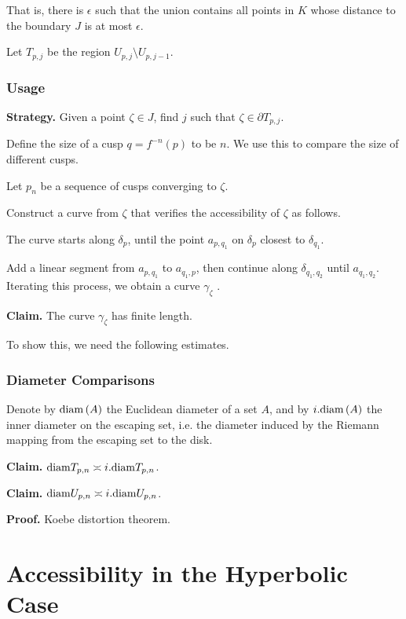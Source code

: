 \documentclass[hebrew,english]{article}
\begin{document}
That is, there is $\epsilon$ such that the union contains all points
in $K$ whose distance to the boundary $J$ is at most $\epsilon$.

Let $T_{p,j}$ be the region $U_{p,j}\setminus U_{p,j-1}$.

\subsubsection*{Usage}

\textbf{Strategy. }Given a point $\zeta\in J$, find $j$ such that
$\zeta\in\partial T_{p,j}$. 

Define the size of a cusp $q=f^{-n}(p)$ to be $n$. We use this to
compare the size of different cusps.

Let $p_{n}$ be a sequence of cusps converging to $\zeta$.

Construct a curve from $\zeta$ that verifies the accessibility of
$\zeta$ as follows. 

The curve starts along $\delta_{p}$, until the point $a_{p,q_{1}}$
on $\delta_{p}$ closest to $\delta_{q_{1}}$. 

Add a linear segment from $a_{p,q_{1}}$ to $a_{\ensuremath{q_{1},p}}$,
then continue along $\delta_{q_{1},q_{2}}$ until $a_{q_{1},q_{2}}$.
Iterating this process, we obtain a curve $\gamma_{\zeta}$ .

\textbf{Claim. }The curve $\gamma_{\zeta}$ has finite length.

To show this, we need the following estimates.

\subsubsection*{Diameter Comparisons}

Denote by $\mathrm{\mathrm{diam}}\left(A\right)$ the Euclidean diameter of a set $A$,
and by $i.\mathrm{\mathrm{diam}}\left(A\right)$ the inner diameter on the escaping
set, i.e. the diameter induced by the Riemann mapping from the escaping
set to the disk.

\textbf{Claim. }$\mathrm{\mathrm{diam}} T_{p,n}\asymp i.\mathrm{\mathrm{diam}} T_{p,n}$.

\textbf{Claim. }$\mathrm{\mathrm{diam}} U_{p,n}\asymp i.\mathrm{\mathrm{diam}} U_{p,n}$.

\textbf{Proof. }Koebe distortion theorem.

\section{Accessibility in the Hyperbolic Case}
\end{document}
